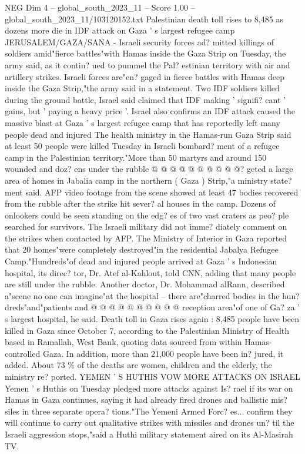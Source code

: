 \begin{textsample}{NEG Dim 4 – global\_south\_2023\_11 – Score 1.00 – global\_south\_2023\_11/103120152.txt}  \label{ex:f4_neg_294}
Palestinian death toll rises to 8,485 as dozens more die in IDF attack on Gaza ' s largest refugee camp JERUSALEM/GAZA/SANA - Israeli security forces ad? mitted killings of soldiers amid"fierce battles"with Hamas inside the Gaza Strip on Tuesday, the army said, as it contin? ued to pummel the Pal? estinian territory with air and artillery strikes.
Israeli forces are"en? gaged in fierce battles with Hamas deep inside the Gaza Strip,"the army said in a statement.
Two IDF soldiers killed during the ground battle, Israel said claimed that IDF making ' signifi? cant ' gains, but ' paying a heavy price '.
Israel also confirms an IDF attack caused the massive blast at Gaza ' s largest refugee camp that has reportedly left many people dead and injured The health ministry in the Hamas-run Gaza Strip said at least 50 people were killed Tuesday in Israeli bombard? ment of a refugee camp in the Palestinian territory."More than 50 martyrs and around 150 wounded and doz? ens under the rubble @ @ @ @ @ @ @ @ @ @? geted a large area of homes in Jabalia camp in the northern ( Gaza ) Strip,"a ministry state? ment said.
AFP video footage from the scene showed at least 47 bodies recovered from the rubble after the strike hit sever? al houses in the camp.
Dozens of onlookers could be seen standing on the edg? es of two vast craters as peo? ple searched for survivors.
The Israeli military did not imme? diately comment on the strikes when contacted by AFP.
The Ministry of Interior in Gaza reported that 20 homes"were completely destroyed"in the residential Jabalya Refugee Camp."Hundreds"of dead and injured people arrived at Gaza ' s Indonesian hospital, its direc? tor, Dr.
Atef al-Kahlout, told CNN, adding that many people are still under the rubble.
Another doctor, Dr.
Mohammad alRann, described a"scene no one can imagine"at the hospital -- there are"charred bodies in the hun? dreds"and"patients and @ @ @ @ @ @ @ @ @ @ reception area"of one of Ga? za ' s largest hospital, he said.
Death toll in Gaza rises again : 8,485 people have been killed in Gaza since October 7, according to the Palestinian Ministry of Health based in Ramallah, West Bank, quoting data sourced from within Hamas-controlled Gaza.
In addition, more than 21,000 people have been in? jured, it added.
About 73 \% of the deaths are women, children and the elderly, the ministry re? ported.
YEMEN ' S HUTHIS VOW MORE ATTACKS ON ISRAEL Yemen ' s Huthis on Tuesday pledged more attacks against Is? rael if its war on Hamas in Gaza continues, saying it had already fired drones and ballistic mis? siles in three separate opera? tions."The Yemeni Armed Forc? es... confirm they will continue to carry out qualitative strikes with missiles and drones un? til the Israeli aggression stops,"said a Huthi military statement aired on its Al-Masirah TV.

\end{textsample}
